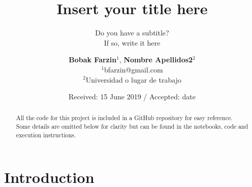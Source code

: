 \documentclass[smallcondensed]{svjour3}     %
\begin{document}
\title{Insert your title here%
}
\subtitle{Do you have a subtitle?\\ If so, write it here}


\author {\textbf{Bobak Farzin$^1$}, \textbf{Nombre Apellidos2$^2$}\\
	$^1$bfarzin@gmail.com\\
	$^2$Universidad o lugar de trabajo\\
}




\date{Received: 15 June 2019 / Accepted: date}


\maketitle

\begin{abstract}

All the code for this project is included in a GitHub \cite{} repository for easy reference.  Some details are omitted below for clarity but can be found in the notebooks, code and execution instructions.

\end{abstract}

\section{Introduction}
\label{intro}
\end{document}
